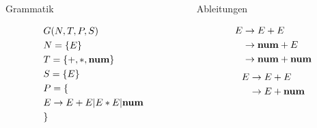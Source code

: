 \documentclass[t]{beamer}
\begin{document}
    \begin{frame}
        \vspace{-1em}
        \begin{columns}[T]
            \begin{column}{0.33\textwidth}
                \centering
                \begin{block}{Grammatik}
                    \vspace{-1em}
                    \begin{minipage}[t][7.5cm]{\linewidth}
                        \begin{align*}
                            & G(N,T,P,S) \\
                            & N= \{E\} \\
                            & T= \{+, *, \bold{num}\} \\
                            & S= \{E\}  \\
                            & P = \{ \\
                            & E \rightarrow E + E | E * E | \bold{num} \\
                            & \}
                        \end{align*}
                    \end{minipage}
                \end{block}
            \end{column}
            \begin{column}{0.33\textwidth}
                \centering
                \begin{block}{Ableitungen}
                    \vspace{-1em}
                    \begin{minipage}[t][7.5cm]{\linewidth}
                        \begin{align*}
                            & E \rightarrow E + E \\
                            & \phantom{E} \rightarrow \bold{num} + E \\
                            & \phantom{E} \rightarrow \bold{num} + \bold{num} \\
                        \end{align*}
                        \vspace{-2em}
                        \begin{align*}
                            & E \rightarrow E + E \\
                            & \phantom{E} \rightarrow E + \bold{num} \\

\end{align*}
\end{minipage}
\end{block}
\end{column}
\end{columns}
\end{frame}
\end{document}
